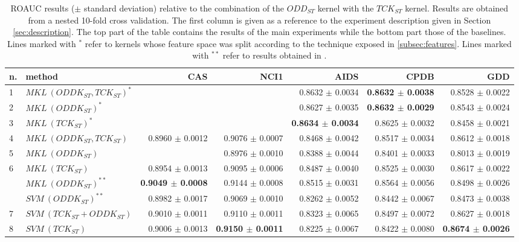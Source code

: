 \begin{landscape}

    \begin{table}[ht]
        \begin{tabular}{|l|l|r|r|r|r|r|}
            \hline
            n. &method&CAS&NCI1&AIDS&CPDB&GDD\\
            \hline
            1& $MKL~(ODDK_{ST}, TCK_{ST})^*$&&&0.8632 $\pm$ 0.0034&\textbf{0.8632 $\pm$ 0.0038}&0.8528 $\pm$ 0.0022\\
            2& $MKL~(ODDK_{ST})^*$&&&0.8627 $\pm$ 0.0035&\textbf{0.8632 $\pm$  0.0029}&0.8543 $\pm$ 0.0024\\
            3& $MKL~(TCK_{ST})^*$&&&\textbf{0.8634 $\pm$ 0.0034}&0.8625 $\pm$ 0.0032&0.8458 $\pm$ 0.0021\\
            \hline
            4& $MKL~(ODDK_{ST}, TCK_{ST})$&0.8960 $\pm$  0.0012&0.9076 $\pm$ 0.0007&0.8468 $\pm$ 0.0042&0.8517 $\pm$ 0.0034&0.8612 $\pm$ 0.0018\\
            5& $MKL~(ODDK_{ST})$&&0.8976 $\pm$ 0.0010 &0.8388 $\pm$ 0.0044&0.8401 $\pm$ 0.0033&0.8013 $\pm$ 0.0019\\
            6& $MKL~(TCK_{ST})$&0.8954 $\pm$ 0.0013&0.9095 $\pm$ 0.0006&0.8487 $\pm$ 0.0040&0.8525 $\pm$ 0.0030&0.8617 $\pm$ 0.0022\\
             & $MKL~(ODDK_{ST})^{**}$&\textbf{0.9049 $\pm$ 0.0008}&0.9144 $\pm$ 0.0008&0.8515 $\pm$ 0.0031&0.8564 $\pm$ 0.0056&0.8498 $\pm$ 0.0026\\
             & $SVM~(ODDK_{ST})^{**}$&0.8982 $\pm$ 0.0017&0.9069 $\pm$ 0.0010&0.8262 $\pm$ 0.0052&0.8442 $\pm$ 0.0067&0.8473 $\pm$ 0.0038\\
            7& $SVM~(TCK_{ST} + ODDK_{ST})$&0.9010 $\pm$ 0.0011&0.9110 $\pm$ 0.0011&0.8323 $\pm$ 0.0065&0.8497 $\pm$ 0.0072&0.8627 $\pm$ 0.0018\\
            8& $SVM~(TCK_{ST})$&0.9006 $\pm$ 0.0013&\textbf{0.9150 $\pm$ 0.0011}&0.8225 $\pm$ 0.0067&0.8422 $\pm$ 0.0080&\textbf{0.8674 $\pm$ 0.0026}\\
            \hline
        \end{tabular}
        \caption{ROAUC results ($\pm$ standard deviation) relative to the combination
            of the $ODD_{ST}$ kernel with the $TCK_{ST}$ kernel. Results are
            obtained from a nested 10-fold cross validation. The first column is
            given as a reference to the experiment description given in Section
            \ref{sec:description}.
            The top part of the table contains the results of the main experiments
            while the bottom part those of the baselines.
            Lines marked with $^*$ refer to kernels whose feature space was split
            according to the technique exposed in \ref{subsec:features}.
            Lines marked with $^{**}$ refer to results obtained in \cite{gmkl}.
        }
        \label{table:results_st}
        \medskip


\end{table}
\end{landscape}
